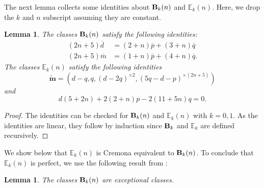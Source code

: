 \documentclass[11pt, reqno]{amsart}
\newtheorem{lemma}[thm]{Lemma}
\theoremstyle{remark}
\numberwithin{equation}{subsection}
\numberwithin{figure}{section}
\theoremstyle{customremark}
\newcommand{\bE}{{\mathbb E}}
\newcommand{\ov}{\overline}
\newcommand{\btm}{\widetilde{\bm{m}}}
\newcommand{\bB}{{\bf{B}}}
\begin{document}
The next lemma collects some identities about $\bB_k(n)$ and $\bE_k(n).$ Here, we drop the $k$ and $n$ subscript assuming they are constant. 
\begin{lemma} \label{lem:cremonaIdent}
    The classes $\bB_k(n)$ satisfy the following identities:
      \begin{align*} 
      (2n+5)\ov{d}&=(2+n)\ov{p}+(3+n)\ov{q} \\
      (2n+5)\ov{m}&=(1+n)\ov{p}+(4+n)\ov{q}.
  \end{align*}
     The classes $\bE_k(n)$ satisfy the following identities
    \[ \btm=(d-q,q,(d-2q)^{\times 2},(5q-d-p)^{\times (2n+5)})\] and 
   \[d(5+2n)+2(2+n)p-2(11+5n)q=0.\]
\end{lemma}
\begin{proof}
    The identities can be checked for $\bB_k(n)$ and $\bE_k(n)$ with $k=0,1.$ As the identities are linear, they follow by induction since $\bB_k$ and $\bE_k$ are defined recursively. 
\end{proof}


We show below that $\bE_k(n)$ is Cremona equivalent to $\bB_k(n)$. To conclude that $\bE_k(n)$ is perfect, we use the following result from \cite{BHM}:
\begin{lemma}{\cite[Proposition 79]{BHM}} \label{lem:bBperfect}
    The classes $\bB_{k}(n)$ are exceptional classes. 
\end{lemma}
\end{document}
